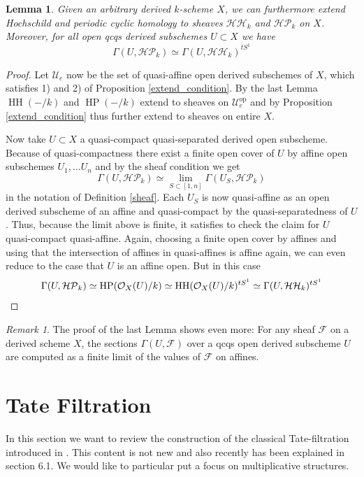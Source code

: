 \documentclass[10pt, reqno]{amsart}
\newtheorem{lemma}[theorem]{Lemma}
\theoremstyle{definition}
\theoremstyle{remark}
\newtheorem{remark}[theorem]{Remark}
\newcommand{\op}{\mathrm{op}}
\renewcommand{\O}{\mathcal O}
\newcommand{\F}{\mathcal{F}}
\newcommand{\U}{\mathcal{U}}
\newcommand{\shvHH}{\mathcal{HH}}
\newcommand{\shvHP}{\mathcal{HP}}
\DeclareMathOperator{\HH}{\mathrm{HH}}
\DeclareMathOperator{\HP}{\mathrm{HP}}
\begin{document}
\begin{lemma}
	Given an arbitrary derived $k$-scheme $X$, we can furthermore extend Hochschild and periodic cyclic homology to sheaves $\shvHH_k$ and $\shvHP_k$ on $X$. Moreover, for all open qcqs derived subschemes $U\subset X$ we have
	\[\Gamma(U,\shvHP_k)\simeq \Gamma(U,\shvHH_k)^{tS^1}\]
\end{lemma}
\begin{proof}
	Let $\U_e$ now be the set of quasi-affine open derived subschemes of $X$, which satisfies 1) and 2) of Proposition \ref{extend_condition}. By the last Lemma $\HH(-/k)$ and $\HP(-/k)$ extend to sheaves on $\U_e^\op$ and by Proposition \ref{extend_condition} thus further extend to sheaves on entire $X$.
	
	Now take $U\subset X$ a quasi-compact quasi-separated derived open subscheme. Because of quasi-compactness there exist a finite open cover of $U$ by affine open subschemes $U_1,\ldots U_n$ and by the sheaf condition we get
	\[\Gamma(U,\shvHP_k)\simeq\lim_{S\subset[1,n]}\Gamma(U_S,\shvHP_k)\]
	in the notation of Definition \ref{sheaf}. Each $U_S$ is now quasi-affine as an open derived subscheme of an affine and quasi-compact by the quasi-separatedness of $U$. Thus, because the limit above is finite, it satisfies to check the claim for $U$ quasi-compact quasi-affine. Again, choosing a finite open cover by affines and using that the intersection of affines in quasi-affines is affine again, we can even reduce to the case that $U$ is an affine open. But in this case 
	\[\Gamma(U,\shvHP_k)\simeq\HP(\O_X(U)/k)\simeq\HH(\O_X(U)/k)^{tS^1}\simeq\Gamma(U,\shvHH_k)^{tS^1}\qedhere\]
\end{proof}

\begin{remark}\label{qcqs_finite}
	The proof of the last Lemma shows even more: For any sheaf $\F$ on a derived scheme $X$, the sections $\Gamma(U,\F)$ over a qcqs open derived subscheme $U$ are computed as a finite limit of the values of $\F$ on affines.
\end{remark}

\section{Tate Filtration}\label{Tatefiltration}
In this section we want to review the construction of the classical Tate-filtration introduced in \cite{GM95}. This content is not new and also recently has been explained in \cite{BL22} section 6.1. We would like to particular put a focus on multiplicative structures.
\end{document}
